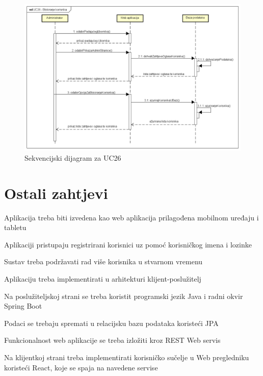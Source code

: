 				\begin{figure}[htb]
					\centering
					\includegraphics[width=14cm]{slike/Sekvencijski dijagram - UC26}
					\caption{Sekvencijski dijagram za UC26}
					\label{fig:Sekvencijski-UC26}
				\end{figure}
				\eject	
	
		\section{Ostali zahtjevi}
		
			\begin{packed_item}
				
				\item Aplikacija treba biti izvedena kao web aplikacija prilagođena mobilnom uređaju i tabletu
				\item Aplikaciji pristupaju registrirani korisnici uz pomoć korisničkog imena i lozinke
				\item Sustav treba podržavati rad više korisnika u stvarnom vremenu
				\item Aplikaciju treba implementirati u arhitekturi klijent-poslužitelj
				\item Na poslužiteljskoj strani se treba koristit programski jezik Java i radni okvir Spring Boot
				\item Podaci se trebaju spremati u relacijsku bazu podataka koristeći JPA
				\item Funkcionalnost web aplikacije se treba izložiti kroz REST Web servis
				\item Na klijentkoj strani treba implementirati korisničko sučelje u Web pregledniku koristeći React, koje se spaja na navedene servise
			\end{packed_item}
			 
			 
			 
	